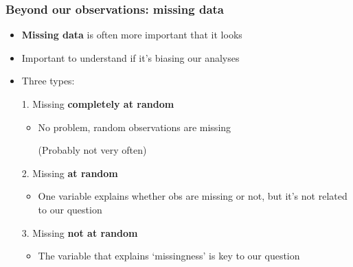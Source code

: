 \documentclass[aspectratio=43]{beamer}
\begin{document}
\begin{frame}
\frametitle{Beyond our observations: missing data}
\centering

\begin{itemize}
  \item \textbf{Missing data} is often more important that it looks
  \item Important to understand if it's biasing our analyses
  \item Three types:
  \item[1.] Missing \textbf{completely at random}
  \begin{itemize}
    \item No problem, random observations are missing
    \item[] (Probably not very often)
  \end{itemize}
  \item[2.] Missing \textbf{at random}
  \begin{itemize}
    \item One variable explains whether obs are missing or not, but it's not related to our question
  \end{itemize}
  \item[3.] Missing \textbf{not at random}
  \begin{itemize}
    \item The variable that explains `missingness' is key to our question
  \end{itemize}
\end{itemize}

{}

\end{frame}
\end{document}
